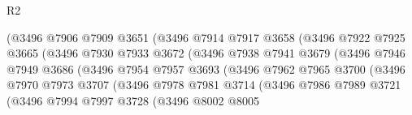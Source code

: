 \begin{lexlean}{R2}
\begin{coremodule}
                                (@3496
                                  @7906
                                  @7909
                                  @3651
                                  (@3496
                                    @7914
                                    @7917
                                    @3658
                                    (@3496
                                      @7922
                                      @7925
                                      @3665
                                      (@3496
                                        @7930
                                        @7933
                                        @3672
                                        (@3496
                                          @7938
                                          @7941
                                          @3679
                                          (@3496
                                            @7946
                                            @7949
                                            @3686
                                            (@3496
                                              @7954
                                              @7957
                                              @3693
                                              (@3496
                                                @7962
                                                @7965
                                                @3700
                                                (@3496
                                                  @7970
                                                  @7973
                                                  @3707
                                                  (@3496
                                                    @7978
                                                    @7981
                                                    @3714
                                                    (@3496
                                                      @7986
                                                      @7989
                                                      @3721
                                                      (@3496
                                                        @7994
                                                        @7997
                                                        @3728
                                                        (@3496
                                                          @8002
                                                          @8005

\end{coremodule}
\end{lexlean}
